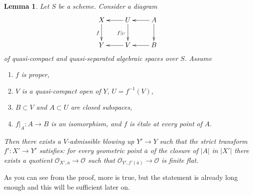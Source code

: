 \documentclass[10pt,a4paper]{amsart}
\theoremstyle{plain}
\newtheorem{lemma}[subsection]{Lemma}
\theoremstyle{definition}
\theoremstyle{remark}
\numberwithin{equation}{subsection}
\begin{document}
\begin{lemma}
\label{lemma-blowup-etale-along}
Let $S$ be a scheme. Consider a diagram
$$
\xymatrix{
X \ar[d]_f & U \ar[l] \ar[d]_{f|_U} & A \ar[d] \ar[l] \\
Y & V \ar[l] & B \ar[l]
}
$$
of quasi-compact and quasi-separated algebraic spaces over $S$.
Assume
\begin{enumerate}
\item $f$ is proper,
\item $V$ is a quasi-compact open of $Y$, $U = f^{-1}(V)$,
\item $B \subset V$ and $A \subset U$ are closed subspaces,
\item $f|_A : A \to B$ is an isomorphism, and
$f$ is \'etale at every point of $A$.
\end{enumerate}
Then there exists a $V$-admissible blowing up $Y' \to Y$ such that the strict
transform $f' : X' \to Y'$ satisfies: for every geometric point
$\overline{a}$ of the closure of $|A|$ in $|X'|$
there exists a quotient $\mathcal{O}_{X', \overline{a}} \to \mathcal{O}$
such that $\mathcal{O}_{Y', f'(\overline{a})} \to \mathcal{O}$
is finite flat.
\end{lemma}

\noindent
As you can see from the proof, more is true, but the statement is
already long enough and this will be sufficient later on.
\end{document}
